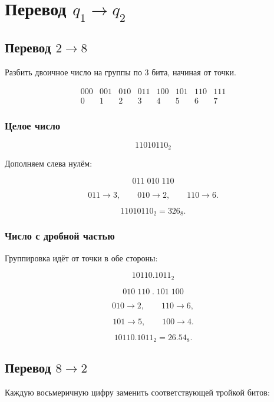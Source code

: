 \documentclass[../final.tex]{subfiles}
\begin{document}
\section{Перевод \texorpdfstring{$q_1 \to q_2$}{q1 → q2}}

\subsection{Перевод \texorpdfstring{$2 \to 8$}{2 → 8}}

Разбить двоичное число на группы по $3$ бита,
начиная от точки.

\[
\begin{array}{cccccccc}
000&001&010&011&100&101&110&111\\[1mm]
0&1&2&3&4&5&6&7
\end{array}
\]

\subsubsection{Целое число}

\[
11010110_2
\]

Дополняем слева нулём:

\[
011\;010\;110
\]

\[
011\longrightarrow3,
\qquad
010\longrightarrow2,
\qquad
110\longrightarrow6.
\]

\[
11010110_2=326_8.
\]


\subsubsection{Число с дробной частью}

Группировка идёт от точки в обе стороны:

\[
10110.1011_2
\]

\[
010\;110
\;.\;
101\;100
\]

\[
010\longrightarrow2,
\qquad
110\longrightarrow6,
\]

\[
101\longrightarrow5,
\qquad
100\longrightarrow4.
\]

\[
10110.1011_2=26.54_8.
\]



\subsection{Перевод \texorpdfstring{$8 \to 2$}{8 → 2}}

Каждую восьмеричную цифру заменить соответствующей тройкой битов:
\end{document}
